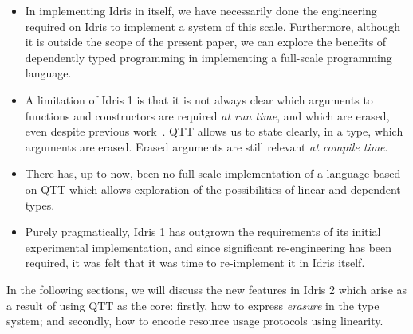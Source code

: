 \begin{itemize}
\item In implementing Idris in itself, we have necessarily done the engineering
required on Idris to implement a system of this scale. Furthermore, although it is
outside the scope of the present paper, we can explore the benefits of
dependently typed programming in implementing a full-scale programming language.
\item A limitation of Idris 1 is that it is not always clear which arguments to
functions and constructors are required \emph{at run time}, and which are 
erased, even despite previous work~\cite{Brady2005,matusicfp,matus-draft}. QTT allows us
to state clearly, in a type, which arguments are erased.
Erased arguments are still relevant \emph{at compile time}.
\item There has, up to now, been no full-scale implementation of a language
based on QTT which allows exploration of the possibilities of linear and
dependent types.
\item Purely pragmatically, Idris 1 has outgrown the requirements of its
initial experimental implementation, and since significant re-engineering has
been required, it was felt that it was time to re-implement it in Idris itself.
\end{itemize}

In the following sections, we will discuss the new features in Idris 2 which
arise as a result of using QTT as the core: firstly, how to express
\emph{erasure} in the type system; and secondly, how to encode resource usage
protocols using linearity.

